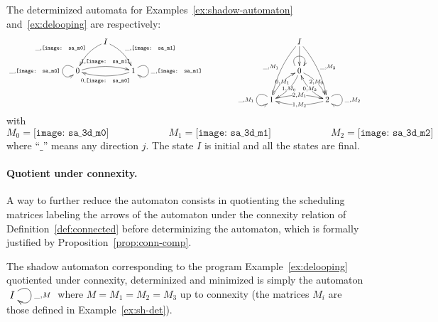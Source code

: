 \documentclass[orivec]{llncs} \usepackage[T1]{fontenc}
\newcommand{\vxym}[1]{\vcenter{\xymatrix{#1}}}
\begin{document}
\begin{example}
  \label{ex:sh-det}
  The determinized automata for Examples~\ref{ex:shadow-automaton}
  and~\ref{ex:delooping} are respectively:
  \[
  \xymatrix{
    &\ar@/_/[dl]_-{\_,\texttt{[image: sa\_m0]}}I\ar@/^/[dr]^-{\_,\texttt{[image: sa\_m1]}}&\\
    \ar@(ul,dl)_-{\_,\texttt{[image: sa\_m0]}}\ar@/^/[rr]^-{1,\texttt{[image: sa\_m1]}}0&&1\ar@/^/[ll]^-{0,\texttt{[image: sa\_m0]}}\ar@(ur,dr)^-{\_,\texttt{[image: sa\_m1]}}\\
  }
  \qquad\qquad
  \xymatrix {
    &\ar@/_/[ddl]_-{\_,M_1}I\ar[d]\ar@/^/[ddr]^-{\_,M_2}&\\
    &\ar@/^/[dl]|-{1,M_0}0\ar@(ul,ur)\ar@/^/[dr]|-{2,M_0}&\\
    1\ar@(ul,dl)_-{\_,M_1}\ar@/^/[ur]|-{0,M_1}\ar@/^/[rr]|-{2,M_1}&&2\ar@/^/[ll]|-{1,M_2}\ar@/^/[ul]|-{0,M_2}\ar@(ur,dr)^-{\_,M_2}\\
  }
  \]
  with
  \vspace{-2ex}
  \[
  M_0=\texttt{[image: sa\_3d\_m0]}
  \qquad\qquad\qquad
  M_1=\texttt{[image: sa\_3d\_m1]}
  \qquad\qquad\qquad
  M_2=\texttt{[image: sa\_3d\_m2]}
  \]
  where ``$\_$'' means any direction $j$. The state $I$ is initial and all the
  states are final.
\end{example}












\paragraph{Quotient under connexity.}
A way to further reduce the automaton consists in quotienting the scheduling
matrices labeling the arrows of the automaton under the connexity relation of
Definition~\ref{def:connected} before determinizing the automaton, which is
formally justified by Proposition~\ref{prop:conn-comp}.

\begin{example}
  The shadow automaton corresponding to the program Example~\ref{ex:delooping}
  quotiented under connexity, determinized and minimized is simply the automaton
  $\vxym{ I\ar@(ur,dr)^{\_,M} }$ where $M=M_1=M_2=M_3$ up to connexity (the
  matrices $M_i$ are those defined in Example~\ref{ex:sh-det}).
\end{example}
\end{document}
